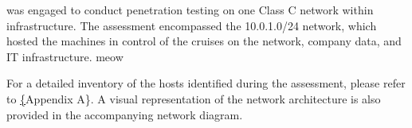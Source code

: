 \team was engaged to conduct penetration testing on one Class C network within \clientP infrastructure. The assessment encompassed the 10.0.1.0/24 network, which hosted the machines in control of the cruises on the network, company data, and IT infrastructure. meow

\bigskip


For a detailed inventory of the hosts identified during the assessment, please refer to \hyperref[sec:networkHostsAppendix]\{Appendix A\}. A visual representation of the network architecture is also provided in the accompanying network diagram.
